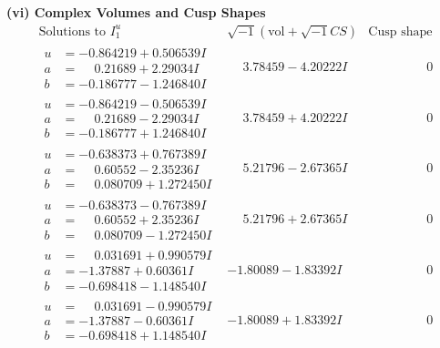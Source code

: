 \documentclass[1p]{elsarticle_modified}
\theoremstyle{definition}
\newcommand{\I}{\sqrt{-1}}
\begin{document}
\newpage\flushleft \textbf{(vi) Complex Volumes and Cusp Shapes}
$$\begin{array}{c|c|c}  
\text{Solutions to }I^u_{1}& \I (\text{vol} + \sqrt{-1}CS) & \text{Cusp shape}\\
 \hline 
\begin{aligned}
u &= -0.864219 + 0.506539 I \\
a &= \phantom{-}0.21689 + 2.29034 I \\
b &= -0.186777 - 1.246840 I\end{aligned}
 & \phantom{-}3.78459 - 4.20222 I & \phantom{-0.000000 } 0 \\ \hline\begin{aligned}
u &= -0.864219 - 0.506539 I \\
a &= \phantom{-}0.21689 - 2.29034 I \\
b &= -0.186777 + 1.246840 I\end{aligned}
 & \phantom{-}3.78459 + 4.20222 I & \phantom{-0.000000 } 0 \\ \hline\begin{aligned}
u &= -0.638373 + 0.767389 I \\
a &= \phantom{-}0.60552 - 2.35236 I \\
b &= \phantom{-}0.080709 + 1.272450 I\end{aligned}
 & \phantom{-}5.21796 - 2.67365 I & \phantom{-0.000000 } 0 \\ \hline\begin{aligned}
u &= -0.638373 - 0.767389 I \\
a &= \phantom{-}0.60552 + 2.35236 I \\
b &= \phantom{-}0.080709 - 1.272450 I\end{aligned}
 & \phantom{-}5.21796 + 2.67365 I & \phantom{-0.000000 } 0 \\ \hline\begin{aligned}
u &= \phantom{-}0.031691 + 0.990579 I \\
a &= -1.37887 + 0.60361 I \\
b &= -0.698418 - 1.148540 I\end{aligned}
 & -1.80089 - 1.83392 I & \phantom{-0.000000 } 0 \\ \hline\begin{aligned}
u &= \phantom{-}0.031691 - 0.990579 I \\
a &= -1.37887 - 0.60361 I \\
b &= -0.698418 + 1.148540 I\end{aligned}
 & -1.80089 + 1.83392 I & \phantom{-0.000000 } 0 \\ \hline\begin{aligned}

\end{aligned}
\end{array}$$
\end{document}
